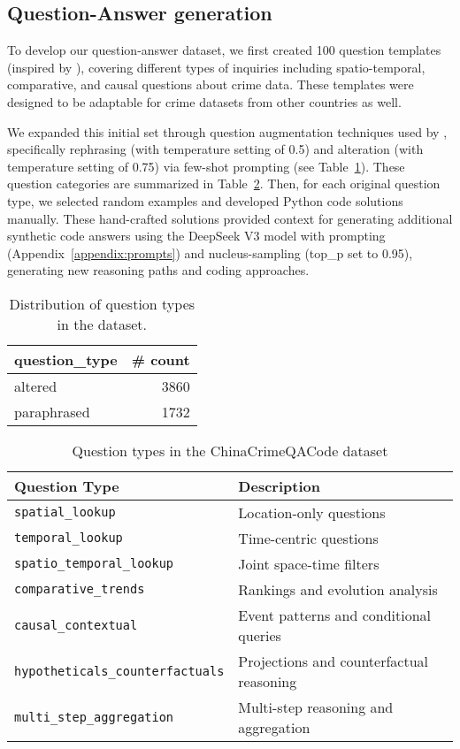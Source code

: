 \subsection{Question-Answer generation}

To develop our question-answer dataset, we first created 100 question templates (inspired by \citep{Dai2024QASTKG, Contractor2020QATourism}), covering different types of inquiries including spatio-temporal, comparative, and causal questions about crime data. These templates were designed to be adaptable for crime datasets from other countries as well.

We expanded this initial set through question augmentation techniques used by \cite{Yin2024MuMathCode, Li2024MuggleMath, Jain2024MetaFineTuning}, specifically rephrasing (with temperature setting of 0.5) and alteration (with temperature setting of 0.75) via few-shot prompting (see Table~\ref{tab:question_type_counts}). These question categories are summarized in Table~\ref{tab:question_types}. Then, for each original question type, we selected random examples and developed Python code solutions manually. These hand-crafted solutions provided context for generating additional synthetic code answers using the DeepSeek V3 model with prompting (Appendix~\ref{appendix:prompts}) and nucleus-sampling \citep{Holtzman2020NucleusSampling, Ahmad2025OCRNVidia, Nvidia2024KaggleMath} (top\_p set to 0.95), generating new reasoning paths and coding approaches.


\begin{table}[H]
\centering
\begin{tabular}{lr}
\hline
\textbf{question\_type} & \textbf{\# count} \\
\hline
altered     & 3860 \\
paraphrased & 1732 \\
\hline
\end{tabular}
\caption{Distribution of question types in the dataset.}
\label{tab:question_type_counts}
\end{table}

\begin{table}[H]
\centering
\caption{Question types in the ChinaCrimeQACode dataset}
\label{tab:question_types}
\begin{tabular}{ll}
\toprule
\textbf{Question Type} & \textbf{Description} \\
\midrule
\texttt{spatial\_lookup} & Location-only questions \\
\texttt{temporal\_lookup} & Time-centric questions \\
\texttt{spatio\_temporal\_lookup} & Joint space-time filters \\
\texttt{comparative\_trends} & Rankings and evolution analysis \\
\texttt{causal\_contextual} & Event patterns and conditional queries \\
\texttt{hypotheticals\_counterfactuals} & Projections and counterfactual reasoning \\
\texttt{multi\_step\_aggregation} & Multi-step reasoning and aggregation \\
\bottomrule
\end{tabular}
\end{table}


